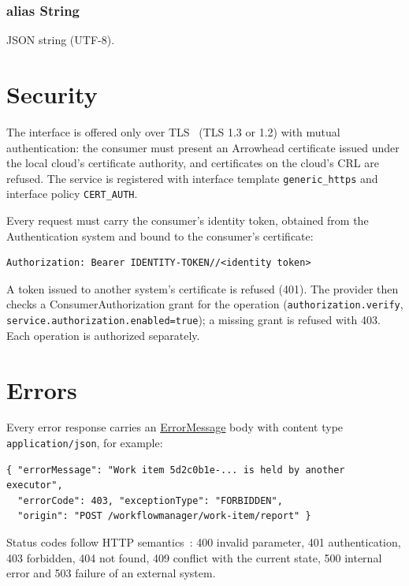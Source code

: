 \documentclass[a4paper]{arrowhead}
\newcommand{\mref}[1]{{\textcolor{ArrowheadPurple}{\hyperref[sec:model:#1]{#1}}}}
\newcommand{\pdef}[1]{{\textcolor{ArrowheadGrey}{#1\label{sec:model:primitives:#1}\label{sec:model:primitives:#1s}}}}
\begin{document}
\subsubsection*{alias \pdef{String}}
JSON string (UTF-8).



\section{Security}
\label{sec:security}
The interface is offered only over TLS~\cite{rfc8446} (TLS 1.3 or 1.2) with mutual authentication: the consumer must
present an Arrowhead certificate issued under the local cloud's certificate authority, and certificates on the
cloud's CRL are refused. The service is registered with interface template \texttt{generic\_https} and interface
policy \texttt{CERT\_AUTH}.

Every request must carry the consumer's identity token, obtained from the Authentication system and bound to the
consumer's certificate:
\begin{lstlisting}
Authorization: Bearer IDENTITY-TOKEN//<identity token>
\end{lstlisting}
A token issued to another system's certificate is refused (401). The provider then checks a ConsumerAuthorization
grant for the operation (\texttt{authorization.verify}, \texttt{service.authorization.enabled=true}); a missing grant is
refused with 403. Each operation is authorized separately.


\section{Errors}
\label{sec:errors}
Every error response carries an \mref{ErrorMessage} body with content type \texttt{application/json}, for example:
\begin{lstlisting}
{ "errorMessage": "Work item 5d2c0b1e-... is held by another executor",
  "errorCode": 403, "exceptionType": "FORBIDDEN",
  "origin": "POST /workflowmanager/work-item/report" }
\end{lstlisting}
Status codes follow HTTP semantics~\cite{rfc9110}: 400 invalid parameter, 401 authentication, 403 forbidden, 404 not
found, 409 conflict with the current state, 500 internal error and 503 failure of an external system.
\end{document}
